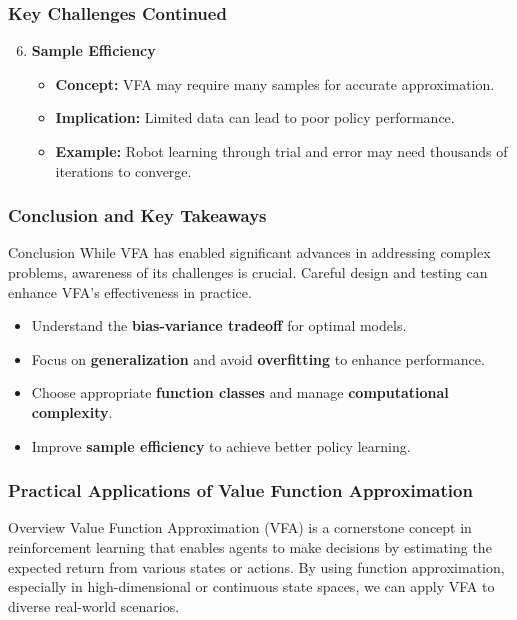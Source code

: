 \documentclass[aspectratio=169]{beamer}
\begin{document}
\begin{frame}[fragile]
  \frametitle{Key Challenges Continued}
  \begin{enumerate}
    \setcounter{enumi}{5} %
    \item \textbf{Sample Efficiency}
      \begin{itemize}
        \item \textbf{Concept:} VFA may require many samples for accurate approximation.
        \item \textbf{Implication:} Limited data can lead to poor policy performance.
        \item \textbf{Example:} Robot learning through trial and error may need thousands of iterations to converge.
      \end{itemize}
  \end{enumerate}
\end{frame}

\begin{frame}[fragile]
  \frametitle{Conclusion and Key Takeaways}
  \begin{block}{Conclusion}
    While VFA has enabled significant advances in addressing complex problems, awareness of its challenges is crucial. Careful design and testing can enhance VFA's effectiveness in practice.
  \end{block}
  
  \begin{itemize}
    \item Understand the \textbf{bias-variance tradeoff} for optimal models.
    \item Focus on \textbf{generalization} and avoid \textbf{overfitting} to enhance performance.
    \item Choose appropriate \textbf{function classes} and manage \textbf{computational complexity}.
    \item Improve \textbf{sample efficiency} to achieve better policy learning.
  \end{itemize}
\end{frame}

\begin{frame}[fragile]
    \frametitle{Practical Applications of Value Function Approximation}
    \begin{block}{Overview}
        Value Function Approximation (VFA) is a cornerstone concept in reinforcement learning that enables agents to make decisions by estimating the expected return from various states or actions. 
        By using function approximation, especially in high-dimensional or continuous state spaces, we can apply VFA to diverse real-world scenarios.
    \end{block}
\end{frame}
\end{document}
